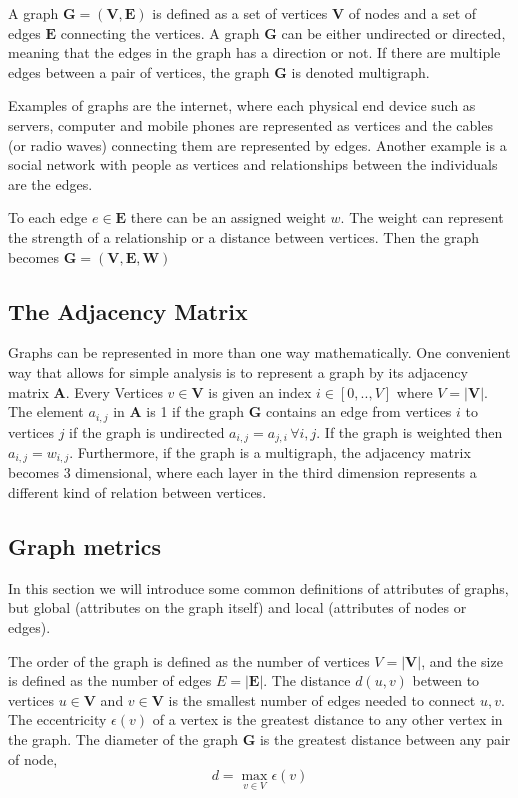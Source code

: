 \newcommand{\graph}{\textbf{G}}
\newcommand{\vertices}{\textbf{V}}
\newcommand{\edges}{\textbf{E}}
\newcommand{\weights}{\textbf{W}}
\newcommand{\adjmat}{\textbf{A}}

A graph $\graph=(\vertices,\edges)$ is defined as a set of vertices $\vertices$ of nodes and a set of edges $\edges$ connecting the vertices. A graph $\graph$ can be either undirected or directed, meaning that the edges in the graph has a direction or not. If there are multiple edges between a pair of vertices, the graph $\graph$ is denoted multigraph.

Examples of graphs are the internet, where each physical end device such as servers, computer and mobile phones are represented as vertices and the cables (or radio waves) connecting them are represented by edges. Another example is a social network with people as vertices and relationships between the individuals are the edges.

To each edge $e\in\edges$ there can be an assigned weight $w$. The weight can represent the strength of a relationship or a distance between vertices. Then the graph becomes $\graph=(\vertices,\edges,\weights)$

\subsection{The Adjacency Matrix}
Graphs can be represented in more than one way mathematically. One convenient way that allows for simple analysis is to represent a graph by its adjacency matrix $\adjmat$. Every Vertices $v\in\vertices$ is given an index $i \in [0,..,V]$ where $V = |\vertices|$. The element $a_{i,j}$ in $\adjmat$ is 1 if the graph $\graph$ contains an edge from vertices $i$ to vertices $j$ if the graph is undirected $a_{i,j}=a_{j,i}\, \forall i,j$\cite{adj_matrix}. If the graph is weighted then $a_{i,j} = w_{i,j}$. Furthermore, if the graph is a multigraph, the adjacency matrix becomes 3 dimensional, where each layer in the third dimension represents a different kind of relation between vertices.

\subsection{Graph metrics}
In this section we will introduce some common definitions of attributes of graphs, but global (attributes on the graph itself) and local (attributes of nodes or edges).

The order of the graph is defined as the number of vertices $V=|\vertices|$, and the size is defined as the number of edges $E=|\edges|$. The distance $d(u,v)$ between to vertices $u\in\vertices$ and $v\in\vertices$ is the smallest number of edges needed to connect $u,v$. The eccentricity $\epsilon(v)$ of a vertex is the greatest distance to any other vertex in the graph. The diameter of the graph $\graph$ is the greatest distance between any pair of node\cite{graph_theory}, $$d = \max_{v \in V}\epsilon(v)$$

